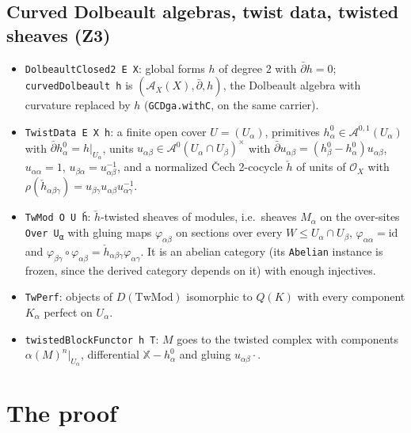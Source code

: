 \documentclass[11pt,a4paper]{article}
\newcommand{\lsub}[1]{\textsubscript{#1}}
\newcommand{\code}[1]{\texttt{#1}}
\newcommand{\cA}{\mathcal{A}}
\newcommand{\Ocal}{\mathcal{O}}
\newcommand{\dbar}{\bar\partial}
\newcommand{\X}{\mathbb{X}}
\newcommand{\hc}{\check h}
\begin{document}
\subsection{Curved Dolbeault algebras, twist data, twisted sheaves (Z3)}\label{sec:tw-defs}
\begin{itemize}
\item \code{DolbeaultClosed2 E X}: global forms $h$ of degree $2$ with $\dbar h=0$;
\code{curvedDolbeault h} is $(\cA_X(X),\dbar,h)$, the Dolbeault algebra with curvature replaced
by $h$ (\code{GCDga.withC}, on the same carrier).
\item \code{TwistData E X h}: a finite open cover $U=(U_\alpha)$, primitives
$h^0_\alpha\in\cA^{0,1}(U_\alpha)$ with $\dbar h^0_\alpha=h|_{U_\alpha}$, units
$u_{\alpha\beta}\in\cA^0(U_\alpha\cap U_\beta)^\times$ with
$\dbar u_{\alpha\beta}=(h^0_\beta-h^0_\alpha)u_{\alpha\beta}$, $u_{\alpha\alpha}=1$,
$u_{\beta\alpha}=u_{\alpha\beta}^{-1}$, and a normalized Čech 2-cocycle $\hc$ of units of
$\Ocal_X$ with $\rho(\hc_{\alpha\beta\gamma})=u_{\beta\gamma}u_{\alpha\beta}u_{\alpha\gamma}^{-1}$.
\item \code{TwMod O U ȟ}: $\hc$-twisted sheaves of modules, i.e.\ sheaves $M_\alpha$ on the
over-sites \code{Over U\lsub{α}} with gluing maps $\varphi_{\alpha\beta}$ on sections over every
$W\le U_\alpha\cap U_\beta$, $\varphi_{\alpha\alpha}=\mathrm{id}$ and
$\varphi_{\beta\gamma}\circ\varphi_{\alpha\beta}=\hc_{\alpha\beta\gamma}\varphi_{\alpha\gamma}$. It is an
abelian category (its \code{Abelian} instance is frozen, since the derived category depends on it)
with enough injectives.
\item \code{TwPerf}: objects of $D(\mathrm{TwMod})$ isomorphic to $Q(K)$ with every component
$K_\alpha$ perfect on $U_\alpha$.
\item \code{twistedBlockFunctor h T}: $M$ goes to the twisted complex with components
$\alpha(M)^n|_{U_\alpha}$, differential $\X-h^0_\alpha$ and gluing $u_{\alpha\beta}\cdot$.
\end{itemize}

\section{The proof}
\end{document}
